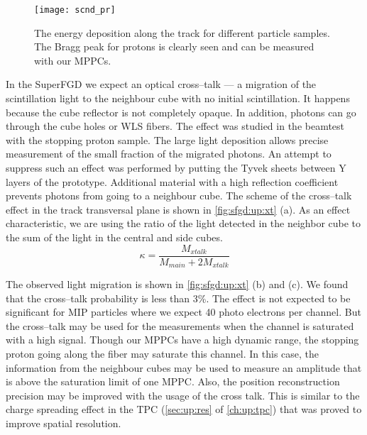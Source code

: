 \documentclass[main.tex]{subfiles}
\begin{document}
\begin{figure}[!ht]
	\centering
	\texttt{[image: scnd\_pr]}
	\caption{The energy deposition along the track for different particle samples. The Bragg peak for protons is clearly seen and can be measured with our MPPCs.}
	\label{fig:up:sfgd:scnd_pr}
\end{figure}

In the SuperFGD we expect an optical cross--talk --- a migration of the scintillation light to the neighbour cube with no initial scintillation. It happens because the cube reflector is not completely opaque. In addition, photons can go through the cube holes or WLS fibers. The effect was studied in the beamtest with the stopping proton sample. The large light deposition allows precise measurement of the small fraction of the migrated photons. An attempt to suppress such an effect was performed by putting the Tyvek sheets between Y layers of the prototype. Additional material with a high reflection coefficient prevents photons from going to a neighbour cube. The scheme of the cross--talk effect in the track transversal plane is shown in \autoref{fig:sfgd:up:xt} (a). As an effect characteristic, we are using the ratio of the light detected in the neighbor cube to the sum of the light in the central and side cubes.
\begin{equation}
\label{eq:xt}
\kappa=\frac{M_{xtalk}}{M_{main}+2M_{xtalk}}
\end{equation}

The observed light migration is shown in \autoref{fig:sfgd:up:xt} (b) and (c). We found that the cross--talk probability is less than 3\%. The effect is not expected to be significant for MIP particles where we expect 40 photo electrons per channel. But the cross--talk may be used for the measurements when the channel is saturated with a high signal. Though our MPPCs have a high dynamic range, the stopping proton going along the fiber may saturate this channel. In this case, the information from the neighbour cubes may be used to measure an amplitude that is above the saturation limit of one MPPC. Also, the position reconstruction precision may be improved with the usage of the cross talk. This is similar to the charge spreading effect in the TPC (\autoref{sec:up:res} of \autoref{ch:up:tpc}) that was proved to improve spatial resolution. 
\end{document}
